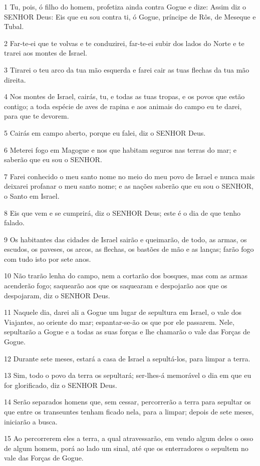 \par 1 Tu, pois, ó filho do homem, profetiza ainda contra Gogue e dize: Assim diz o SENHOR Deus: Eis que eu sou contra ti, ó Gogue, príncipe de Rôs, de Meseque e Tubal.
\par 2 Far-te-ei que te volvas e te conduzirei, far-te-ei subir dos lados do Norte e te trarei aos montes de Israel.
\par 3 Tirarei o teu arco da tua mão esquerda e farei cair as tuas flechas da tua mão direita.
\par 4 Nos montes de Israel, cairás, tu, e todas as tuas tropas, e os povos que estão contigo; a toda espécie de aves de rapina e aos animais do campo eu te darei, para que te devorem.
\par 5 Cairás em campo aberto, porque eu falei, diz o SENHOR Deus.
\par 6 Meterei fogo em Magogue e nos que habitam seguros nas terras do mar; e saberão que eu sou o SENHOR.
\par 7 Farei conhecido o meu santo nome no meio do meu povo de Israel e nunca mais deixarei profanar o meu santo nome; e as nações saberão que eu sou o SENHOR, o Santo em Israel.
\par 8 Eis que vem e se cumprirá, diz o SENHOR Deus; este é o dia de que tenho falado.
\par 9 Os habitantes das cidades de Israel sairão e queimarão, de todo, as armas, os escudos, os paveses, os arcos, as flechas, os bastões de mão e as lanças; farão fogo com tudo isto por sete anos.
\par 10 Não trarão lenha do campo, nem a cortarão dos bosques, mas com as armas acenderão fogo; saquearão aos que os saquearam e despojarão aos que os despojaram, diz o SENHOR Deus.
\par 11 Naquele dia, darei ali a Gogue um lugar de sepultura em Israel, o vale dos Viajantes, ao oriente do mar; espantar-se-ão os que por ele passarem. Nele, sepultarão a Gogue e a todas as suas forças e lhe chamarão o vale das Forças de Gogue.
\par 12 Durante sete meses, estará a casa de Israel a sepultá-los, para limpar a terra.
\par 13 Sim, todo o povo da terra os sepultará; ser-lhes-á memorável o dia em que eu for glorificado, diz o SENHOR Deus.
\par 14 Serão separados homens que, sem cessar, percorrerão a terra para sepultar os que entre os transeuntes tenham ficado nela, para a limpar; depois de sete meses, iniciarão a busca.
\par 15 Ao percorrerem eles a terra, a qual atravessarão, em vendo algum deles o osso de algum homem, porá ao lado um sinal, até que os enterradores o sepultem no vale das Forças de Gogue.
